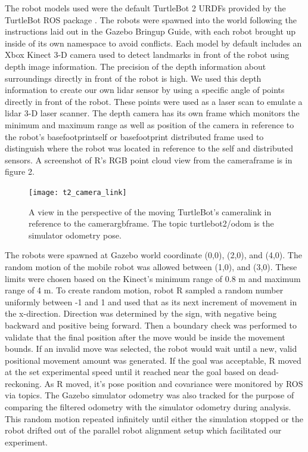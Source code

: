 \documentclass[conference]{IEEEtran} \usepackage[T1]{fontenc} \usepackage[backend=biber, style=ieee]{biblatex}
\begin{document}
The robot models used were the default TurtleBot 2 URDFs provided by the TurtleBot ROS package \cite{turtlebot}. The
robots were spawned into the world following the instructions laid out in the Gazebo Bringup Guide, with each robot
brought up inside of its own namespace to avoid conflicts. Each model by default includes an Xbox Kinect 3-D
camera used to detect landmarks in front of the robot using depth image information. The precision of the depth information
about surroundings directly in front of the robot is high. We used this depth information to create our own lidar 
sensor by using a specific angle of points directly in front of the robot. These points were used as a laser scan to emulate
a lidar 3-D laser scanner. The depth camera has its own frame which monitors the minimum and maximum range as well as position
of the camera in reference to the robot's base\textunderscore footprint\textunderscore self or base\textunderscore footprint\textunderscore
distributed frame used to distinguish where the robot was located in reference to the self and distributed sensors. A screenshot 
of R's RGB point cloud view from the camera\textunderscore frame is in figure 2.

\begin{figure}
\label{pic2} 
\centering 
\texttt{[image: t2\_camera\_link]}
\caption{A view in the perspective of the moving TurtleBot's camera\textunderscore link in reference to the camera\textunderscore rgb\textunderscore frame. 
The topic turtlebot2/odom is the simulator odometry pose.}
\end{figure}

The robots were spawned at Gazebo world coordinate (0,0), (2,0), and (4,0). The random motion of the mobile robot was
allowed between (1,0), and (3,0). These limits were chosen based on the Kinect's minimum range of 0.8 m and maximum range 
of 4 m. To create random motion, robot R sampled a random number uniformly between -1 and 1 and used that as its next increment
of movement in the x-direction. Direction was determined by the sign, with negative being backward and positive being forward. 
Then a boundary check was performed to validate that the final position after the move would be inside the movement bounds. 
If an invalid move was selected, the robot would wait until a new, valid positional movement amount was generated. If 
the goal was acceptable, R moved at the set experimental speed until it reached near the goal based on dead-reckoning. As R
moved, it's pose position and covariance were monitored by ROS via topics. The Gazebo simulator odometry was also tracked 
for the purpose of comparing the filtered odometry with the simulator odometry during analysis. This random motion repeated infinitely 
until either the simulation stopped or the robot drifted out of the parallel robot alignment setup which facilitated our experiment.
\end{document}
